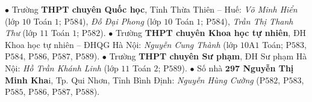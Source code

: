 \begin{multicols}{2}
	\vskip 0.05cm
	$\bullet$ Trường \textbf{\color{thachthuctoanhoc}THPT chuyên Quốc học}, Tỉnh Thừa Thiên -- Huế: \textit{Võ Minh Hiển} (lớp $10$ Toán $1$; P$584$), \textit{Đỗ Đại Phong} (lớp $10$ Toán $1$; P$584$), \textit{Trần Thị Thanh Thư} (lớp $11$ Toán $1$; P$582$).
	\vskip 0.05cm
	$\bullet$ Trường \textbf{\color{thachthuctoanhoc}THPT chuyên Khoa học tự nhiên}, ĐH Khoa học tự nhiên -- ĐHQG Hà Nội: \textit{Nguyễn Cung Thành} (lớp $10$A$1$ Toán; P$583$, P$584$, P$586$, P$587$, P$589$).
	\vskip 0.05cm
	$\bullet$ Trường \textbf{\color{thachthuctoanhoc}THPT chuyên Sư phạm}, ĐH Sư phạm Hà Nội: \textit{Hồ Trần Khánh Linh} (lớp $11$ Toán $2$; P$589$).
	\vskip 0.05cm
	$\bullet$ Số nhà \textbf{\color{thachthuctoanhoc}$\pmb{297}$ Nguyễn Thị Minh Kha}i, Tp. Qui Nhơn, Tỉnh Bình Định: \textit{Nguyễn Hùng Cường} (P$582$, P$583$, P$585$, P$586$, P$587$, P$588$).
\end{multicols}

